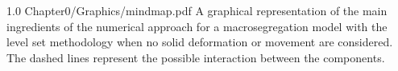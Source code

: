 
\begin{figureth}
{1.0}
{Chapter0/Graphics/mindmap.pdf}
{A graphical representation of the main ingredients of the numerical approach for a macrosegregation model with the level set 
methodology when no solid deformation or movement are considered. The dashed lines represent the possible interaction between the components.}
\label{fig:mindmap}
\end{figureth}



